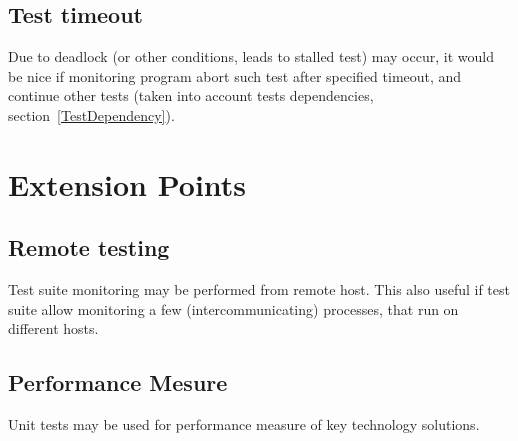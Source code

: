 \documentclass[a4paper,twoside]{article}
\begin{document}
\subsection{Test timeout}

Due to deadlock (or other conditions, leads to stalled test) may occur,
it would be nice if monitoring program abort such test after specified timeout,
and continue other tests (taken into account tests dependencies, section~\ref{TestDependency}).







\section{Extension Points}


\subsection{Remote testing}


Test suite monitoring may be performed from remote host. This also useful
if test suite allow monitoring a few (intercommunicating) processes, that
run on different hosts.

\subsection{Performance Mesure}

Unit tests may be used for performance measure of key technology solutions.

%
%
\end{document}
